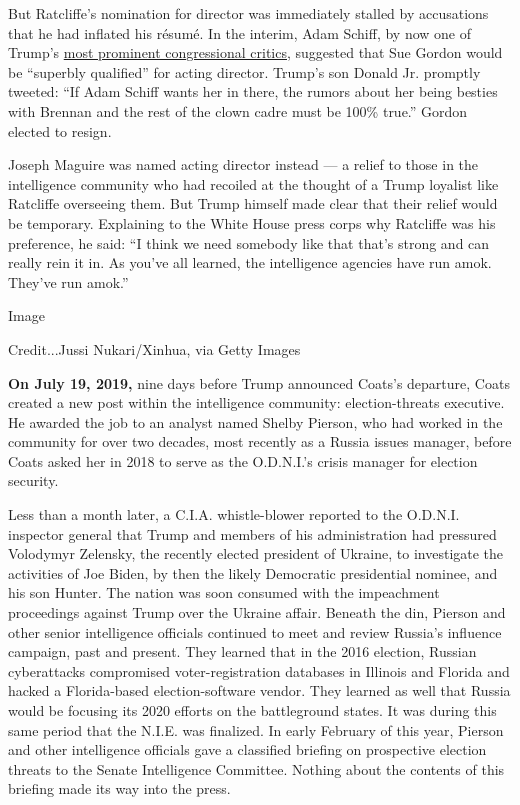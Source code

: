 But Ratcliffe's nomination for director was immediately stalled by
accusations that he had inflated his résumé. In the interim, Adam
Schiff, by now one of Trump's
\href{https://www.nytimes.com/2019/11/05/magazine/adam-schiff-impeachment.html}{most
prominent congressional critics}, suggested that Sue Gordon would be
``superbly qualified'' for acting director. Trump's son Donald Jr.
promptly tweeted: ``If Adam Schiff wants her in there, the rumors about
her being besties with Brennan and the rest of the clown cadre must be
100\% true.'' Gordon elected to resign.

Joseph Maguire was named acting director instead --- a relief to those
in the intelligence community who had recoiled at the thought of a Trump
loyalist like Ratcliffe overseeing them. But Trump himself made clear
that their relief would be temporary. Explaining to the White House
press corps why Ratcliffe was his preference, he said: ``I think we need
somebody like that that's strong and can really rein it in. As you've
all learned, the intelligence agencies have run amok. They've run
amok.''

Image

Credit...Jussi Nukari/Xinhua, via Getty Images

\textbf{On July 19, 2019,} nine days before Trump announced Coats's
departure, Coats created a new post within the intelligence community:
election-threats executive. He awarded the job to an analyst named
Shelby Pierson, who had worked in the community for over two decades,
most recently as a Russia issues manager, before Coats asked her in 2018
to serve as the O.D.N.I.'s crisis manager for election security.

Less than a month later, a C.I.A. whistle-blower reported to the
O.D.N.I. inspector general that Trump and members of his administration
had pressured Volodymyr Zelensky, the recently elected president of
Ukraine, to investigate the activities of Joe Biden, by then the likely
Democratic presidential nominee, and his son Hunter. The nation was soon
consumed with the impeachment proceedings against Trump over the Ukraine
affair. Beneath the din, Pierson and other senior intelligence officials
continued to meet and review Russia's influence campaign, past and
present. They learned that in the 2016 election, Russian cyberattacks
compromised voter-registration databases in Illinois and Florida and
hacked a Florida-based election-software vendor. They learned as well
that Russia would be focusing its 2020 efforts on the battleground
states. It was during this same period that the N.I.E. was finalized. In
early February of this year, Pierson and other intelligence officials
gave a classified briefing on prospective election threats to the Senate
Intelligence Committee. Nothing about the contents of this briefing made
its way into the press.

